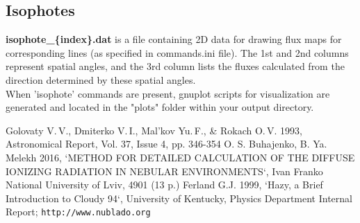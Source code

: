 \documentclass[a4paper]{article}
\begin{document}
\subsection{Isophotes}

{\bf isophote\_\{index\}.dat} is a file containing 2D data for drawing flux maps for corresponding lines (as specified in commands.ini file).
The 1st and 2nd columns represent spatial angles, and the 3rd column lists the fluxes calculated from the direction determined by these spatial angles. \\

When 'isophote' commands are present, gnuplot scripts for visualization are generated and located in the "plots"
folder within your output directory.


\begin{thebibliography}{3}
{\small
{} Golovaty V.\,V., Dmiterko V.\,I., Mal'kov Yu.\,F., \& Rokach O.\,V. 1993, Astronomical Report, Vol. 37, Issue 4, pp. 346-354
 O. S. Buhajenko, B. Ya. Melekh 2016, `METHOD FOR DETAILED CALCULATION OF THE DIFFUSE IONIZING RADIATION IN NEBULAR ENVIRONMENTS`, Ivan Franko National University of Lviv, 4901 (13 p.) 
 Ferland G.J. 1999, `Hazy, a Brief Introduction to Cloudy 94`, University of Kentucky, Physics Department Internal Report; \texttt{http://www.nublado.org}
}
\end{thebibliography}
\end{document}
